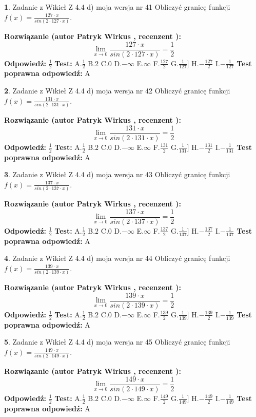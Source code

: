 \documentclass[12pt, a4paper]{article}
\theoremstyle{definition} %
\newtheorem{zad}{}
\newcommand{\zadStart}[1]{\begin{zad}#1\newline}
\newcommand{\zadStop}{\end{zad}}
\newcommand{\rozwStart}[2]{\noindent \textbf{Rozwiązanie (autor #1 , recenzent #2): }\newline}
\newcommand{\rozwStop}{\newline}
\newcommand{\odpStart}{\noindent \textbf{Odpowiedź:}\newline}
\newcommand{\odpStop}{\newline}
\newcommand{\testStart}{\noindent \textbf{Test:}\newline}
\newcommand{\testStop}{\newline}
\newcommand{\kluczStart}{\noindent \textbf{Test poprawna odpowiedź:}\newline}
\newcommand{\kluczStop}{\newline}
\begin{document}
\zadStart{Zadanie z Wikieł Z 4.4 d) moja wersja nr 41}
Obliczyć granicę funkcji $f(x)=\frac{127\cdot x}{sin(2 \cdot127\cdot x)}$.
\zadStop
\rozwStart{Patryk Wirkus}{}
$$\lim\limits_{x\to 0}\frac{127\cdot x}{sin(2 \cdot127\cdot x)}=\frac{1}{2}$$
\rozwStop
\odpStart
$\frac{1}{2}$
\odpStop
\testStart
A.$\frac{1}{2}$
B.$2$
C.$0$
D.$-\infty$
E.$\infty$
F.$\frac{127}{2}$
G.$\frac{1}{127}]$
H.$-\frac{127}{2}$
I.$-\frac{1}{127}$
\testStop
\kluczStart
A
\kluczStop



\zadStart{Zadanie z Wikieł Z 4.4 d) moja wersja nr 42}
Obliczyć granicę funkcji $f(x)=\frac{131\cdot x}{sin(2 \cdot131\cdot x)}$.
\zadStop
\rozwStart{Patryk Wirkus}{}
$$\lim\limits_{x\to 0}\frac{131\cdot x}{sin(2 \cdot131\cdot x)}=\frac{1}{2}$$
\rozwStop
\odpStart
$\frac{1}{2}$
\odpStop
\testStart
A.$\frac{1}{2}$
B.$2$
C.$0$
D.$-\infty$
E.$\infty$
F.$\frac{131}{2}$
G.$\frac{1}{131}]$
H.$-\frac{131}{2}$
I.$-\frac{1}{131}$
\testStop
\kluczStart
A
\kluczStop



\zadStart{Zadanie z Wikieł Z 4.4 d) moja wersja nr 43}
Obliczyć granicę funkcji $f(x)=\frac{137\cdot x}{sin(2 \cdot137\cdot x)}$.
\zadStop
\rozwStart{Patryk Wirkus}{}
$$\lim\limits_{x\to 0}\frac{137\cdot x}{sin(2 \cdot137\cdot x)}=\frac{1}{2}$$
\rozwStop
\odpStart
$\frac{1}{2}$
\odpStop
\testStart
A.$\frac{1}{2}$
B.$2$
C.$0$
D.$-\infty$
E.$\infty$
F.$\frac{137}{2}$
G.$\frac{1}{137}]$
H.$-\frac{137}{2}$
I.$-\frac{1}{137}$
\testStop
\kluczStart
A
\kluczStop



\zadStart{Zadanie z Wikieł Z 4.4 d) moja wersja nr 44}
Obliczyć granicę funkcji $f(x)=\frac{139\cdot x}{sin(2 \cdot139\cdot x)}$.
\zadStop
\rozwStart{Patryk Wirkus}{}
$$\lim\limits_{x\to 0}\frac{139\cdot x}{sin(2 \cdot139\cdot x)}=\frac{1}{2}$$
\rozwStop
\odpStart
$\frac{1}{2}$
\odpStop
\testStart
A.$\frac{1}{2}$
B.$2$
C.$0$
D.$-\infty$
E.$\infty$
F.$\frac{139}{2}$
G.$\frac{1}{139}]$
H.$-\frac{139}{2}$
I.$-\frac{1}{139}$
\testStop
\kluczStart
A
\kluczStop



\zadStart{Zadanie z Wikieł Z 4.4 d) moja wersja nr 45}
Obliczyć granicę funkcji $f(x)=\frac{149\cdot x}{sin(2 \cdot149\cdot x)}$.
\zadStop
\rozwStart{Patryk Wirkus}{}
$$\lim\limits_{x\to 0}\frac{149\cdot x}{sin(2 \cdot149\cdot x)}=\frac{1}{2}$$
\rozwStop
\odpStart
$\frac{1}{2}$
\odpStop
\testStart
A.$\frac{1}{2}$
B.$2$
C.$0$
D.$-\infty$
E.$\infty$
F.$\frac{149}{2}$
G.$\frac{1}{149}]$
H.$-\frac{149}{2}$
I.$-\frac{1}{149}$
\testStop
\kluczStart
A
\kluczStop
\end{document}
